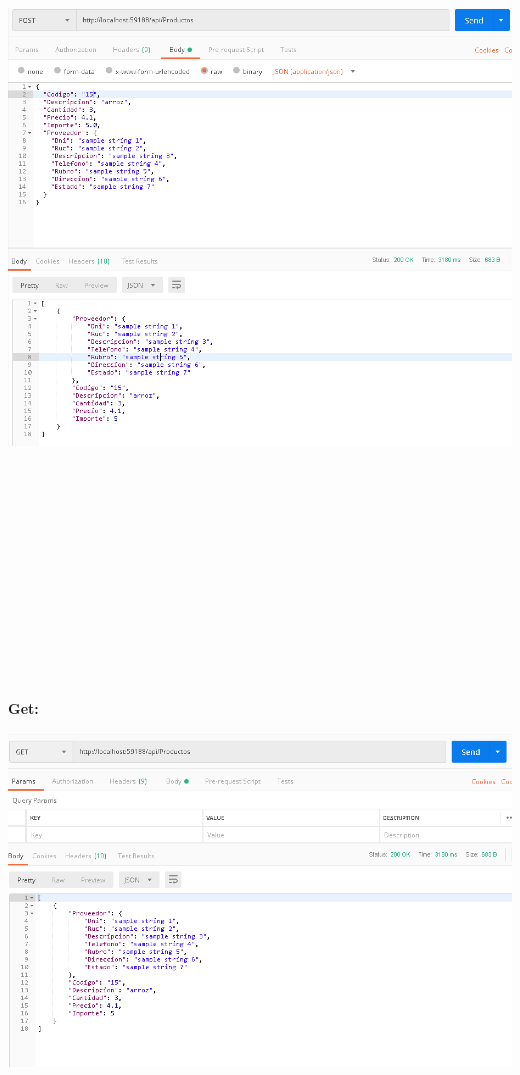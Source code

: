 \begin{flushleft}
\begin{center}
	\includegraphics[width=19cm]{./Imagenes/post3} 
	\end{center}
\textbf{}\\

\textbf{}\\
\textbf{}\\
\textbf{}\\
\textbf{}\\
\textbf{}\\
\textbf{}\\
\textbf{}\\
\textbf{}\\
\textbf{}\\
\textbf{}\\
\textbf{}\\

\textbf{Get:}\\
\begin{center}
	\includegraphics[width=19cm]{./Imagenes/get3} 
	\end{center}
\textbf{}\\


\end{flushleft}
